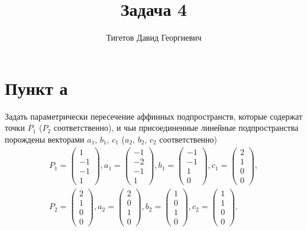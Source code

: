 \documentclass[12pt]{article}
\begin{document}
    \title{Задача 4}
    \author{Тигетов Давид Георгиевич}
    \date{}
    \maketitle

    \section*{Пункт а}
    Задать параметрически пересечение аффинных подпространств, которые содержат точки $P_1$ ($P_2$ соответственно), и чьи присоединенные линейные подпространства порождены векторами
    $a_1$, $b_1$, $c_1$ ($a_2$, $b_2$, $c_2$ соответственно)
    \begin{gather*}
        P_1 =
        \begin{pmatrix}
            1 \\ -1 \\ -1 \\ 1
        \end{pmatrix} ,
        a_1 =
        \begin{pmatrix}
            -1 \\ -2 \\ -1 \\ 1
        \end{pmatrix} ,
        b_1 =
        \begin{pmatrix}
            -1 \\ -1 \\ 1 \\ 0
        \end{pmatrix} ,
        c_1 =
        \begin{pmatrix}
            2 \\ 1 \\ 0 \\ 0
        \end{pmatrix} , \\
        P_2 =
        \begin{pmatrix}
            2 \\ 1 \\ 0 \\ 0
        \end{pmatrix} ,
        a_2 =
        \begin{pmatrix}
            2 \\ 0 \\ 1 \\ 0
        \end{pmatrix} ,
        b_2 =
        \begin{pmatrix}
            1 \\ 0 \\ 1 \\ 0
        \end{pmatrix} ,
        c_2 =
        \begin{pmatrix}
            1 \\ 1 \\ 0 \\ 0
        \end{pmatrix} .
    \end{gather*}
\end{document}
